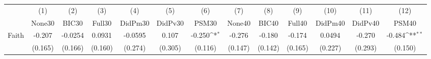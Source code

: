 {
\def\sym#1{\ifmmode^{#1}\else\(^{#1}\)\fi}
\begin{tabular}{l*{12}{c}}
\toprule
            &\multicolumn{1}{c}{(1)}&\multicolumn{1}{c}{(2)}&\multicolumn{1}{c}{(3)}&\multicolumn{1}{c}{(4)}&\multicolumn{1}{c}{(5)}&\multicolumn{1}{c}{(6)}&\multicolumn{1}{c}{(7)}&\multicolumn{1}{c}{(8)}&\multicolumn{1}{c}{(9)}&\multicolumn{1}{c}{(10)}&\multicolumn{1}{c}{(11)}&\multicolumn{1}{c}{(12)}\\
            &\multicolumn{1}{c}{None30}&\multicolumn{1}{c}{BIC30}&\multicolumn{1}{c}{Full30}&\multicolumn{1}{c}{DidPm30}&\multicolumn{1}{c}{DidPv30}&\multicolumn{1}{c}{PSM30}&\multicolumn{1}{c}{None40}&\multicolumn{1}{c}{BIC40}&\multicolumn{1}{c}{Full40}&\multicolumn{1}{c}{DidPm40}&\multicolumn{1}{c}{DidPv40}&\multicolumn{1}{c}{PSM40}\\
\midrule
Faith       &      -0.207         &     -0.0254         &      0.0931         &     -0.0595         &       0.107         &      -0.250\sym{*}  &      -0.276         &      -0.180         &      -0.174         &      0.0494         &      -0.270         &      -0.484\sym{**} \\
            &     (0.165)         &     (0.166)         &     (0.160)         &     (0.274)         &     (0.305)         &     (0.116)         &     (0.147)         &     (0.142)         &     (0.165)         &     (0.227)         &     (0.293)         &     (0.150)         \\
\bottomrule
\end{tabular}
}
